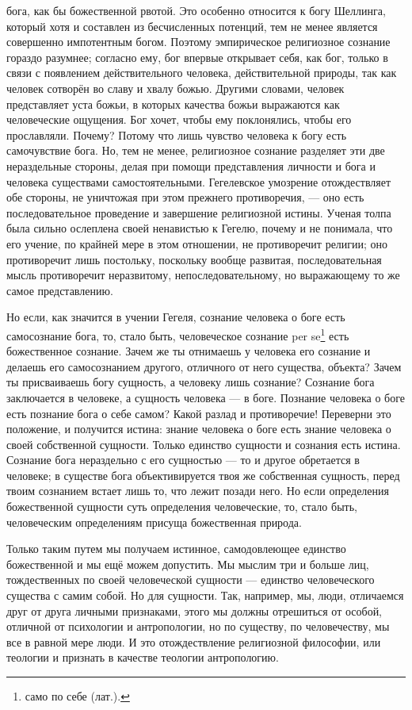 \documentclass[12pt,oneside]{book}
\begin{document}
бога, как бы божественной рвотой. Это особенно относится к богу Шеллинга, который хотя и составлен из бесчисленных потенций, тем не менее является совершенно импотентным богом. Поэтому эмпирическое религиозное сознание гораздо разумнее; согласно ему, бог впервые открывает себя, как бог, только в связи с появлением действительного человека, действительной природы, так как человек сотворён во славу и хвалу божью. Другими словами, человек представляет уста божьи, в которых качества божьи выражаются как человеческие ощущения. Бог хочет, чтобы ему поклонялись, чтобы его прославляли. Почему? Потому что лишь чувство человека к богу есть самочувствие бога. Но, тем не менее, религиозное сознание разделяет эти две нераздельные стороны, делая при помощи представления личности и бога и человека существами самостоятельными. Гегелевское умозрение отождествляет обе стороны, не уничтожая при этом прежнего противоречия, --- оно есть последовательное проведение и завершение религиозной истины. Ученая толпа была сильно ослеплена своей ненавистью к Гегелю, почему и не понимала, что его учение, по крайней мере в этом отношении, не противоречит религии; оно противоречит лишь постольку, поскольку вообще развитая, последовательная мысль противоречит неразвитому, непоследовательному, но выражающему то же самое представлению.



Но если, как значится в учении Гегеля, сознание человека о боге есть самосознание бога, то, стало быть, человеческое сознание per se\footnote{само по себе (лат.).} есть божественное сознание. Зачем же ты отнимаешь у человека его сознание и делаешь его самосознанием другого, отличного от него существа, объекта? Зачем ты присваиваешь богу сущность, а человеку лишь сознание? Сознание бога заключается в человеке, а сущность человека --- в боге. Познание человека о боге есть познание бога о себе самом? Какой разлад и противоречие! Переверни это положение, и получится истина: знание человека о боге есть знание человека о своей собственной сущности. Только единство сущности и сознания есть истина. Сознание бога нераздельно с его сущностью --- то и другое обретается в человеке; в существе бога объективируется твоя же собственная сущность, перед твоим сознанием встает лишь то, что лежит позади него. Но если определения божественной сущности суть определения человеческие, то, стало быть, человеческим определениям присуща божественная природа.

Только таким путем мы получаем истинное, самодовлеющее единство божественной и мы ещё можем допустить. Мы мыслим три и больше лиц, тождественных по своей человеческой сущности --- единство человеческого существа с самим собой. Но для сущности. Так, например, мы, люди, отличаемся друг от друга личными признаками, этого мы должны отрешиться от особой, отличной от психологии и антропологии, но по существу, по человечеству, мы все в равной мере люди. И это отождествление религиозной философии, или теологии и признать в качестве теологии антропологию.
\end{document}

